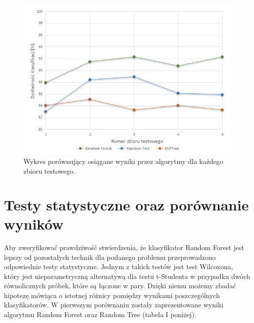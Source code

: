 \documentclass[conference]{IEEEtran}
\begin{document}
\begin{figure}[htbp]
\centerline{\includegraphics[scale=0.65]{pic/CV_chart.png}}
\caption{Wykres porównujący osiągane wyniki przez algorytmy dla każdego zbioru testowego.}
\label{drzewo_decyzyjne}
\end{figure}

\section{Testy statystyczne oraz porównanie wyników}
Aby zweryfikować prawdziwość stwierdzenia, że klasyfikator Random Forest jest lepszy od pozostałych technik dla podanego problemu przeprowadzono odpowiednie testy statystyczne. 
Jednym z takich testów jest test Wilcoxona, który jest nieparametryczną alternatywą dla testu t-Studenta w przypadku dwóch równolicznych próbek, które są łączone w pary. Dzięki niemu możemy zbadać hipotezę mówiąca o istotnej różnicy pomiędzy wynikami poszczególnych klasyfikatorów. W pierwszym porównaniu zostały zaprezentowane wyniki algorytmu Random Forest oraz Random Tree (tabela I poniżej). 
\end{document}

